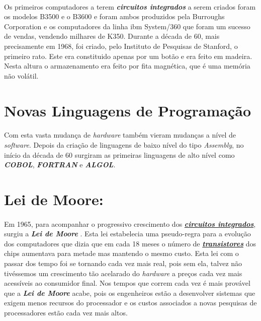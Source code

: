 \documentclass{report}
\begin{document}
\paragraph{}
Os primeiros computadores a terem \textbf{\textit{circuitos integrados}} a serem criados foram os modelos B3500 e o B3600 e foram ambos produzidos pela Burroughs Corporation e os computadores da linha \acs{ibm} System/360 que foram um sucesso de vendas, vendendo milhares de K350.\newline
Durante a década de 60, mais precisamente em 1968, foi criado, pelo Instituto de Pesquisas de Stanford, o primeiro rato. Este era constituido apenas por um botão e era feito em madeira. Nesta altura o armazenamento era feito por fita magnética, que é uma memória não volátil.

\section{Novas Linguagens de Programação}
\paragraph{}
Com esta vasta mudança de \textit{hardware} também vieram mudanças a nível de \textit{software}. Depois da criação de linguagens de baixo nível do tipo \textit{Assembly}, no início da década de 60 surgiram as primeiras linguagens de alto nível como \textbf{\textit{COBOL}}, \textbf{\textit{FORTRAN}} e \textbf{\textit{ALGOL}}. 

\section{Lei de Moore:}				
\paragraph{}
Em 1965, para acompanhar o progressivo crescimento dos \hyperref[sec:circuitos]{\textbf{\textit{circuitos integrados}}}, surgiu a \textbf{\textit{Lei de Moore}} \cite{leidemoore}. Esta lei estabelecia uma pseudo-regra para a evolução dos computadores que dizia que em cada 18 meses o número de \hyperref[sec:transistor]{\textbf{\textit{transistores}}} dos chips aumentava para metade mas mantendo o mesmo custo. Esta lei com o passar dos tempo foi se tornando cada vez mais real, pois sem ela, talvez não tivéssemos um crescimento tão acelarado do \textit{hardware} a preços cada vez mais acessíveis ao consumidor final.
Nos tempos que correm cada vez é mais provável que a \textbf{\textit{Lei de Moore}} acabe, pois os engenheiros estão a desenvolver sistemas que exigem menos recursos do processador e os custos associados a novas pesquisas de processadores estão cada vez mais altos. 
\end{document}
